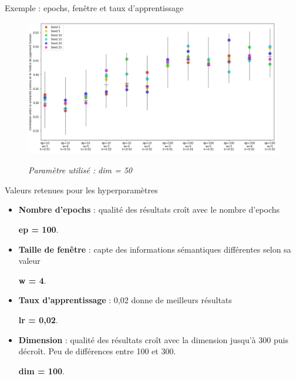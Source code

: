 \documentclass[10pt,xcolor=table,color={dvipsnames,usenames},ignorenonframetext,usepdftitle=false,french]{beamer}
\begin{document}
\begin{frame}{Exemple : epochs, fenêtre et taux d'apprentissage}
\protect\hypertarget{exemple-epochs-fenuxeatre-et-taux-dapprentissage}{}

\begin{figure}[htp]
\begin{center}
\includegraphics[width=1\textwidth]{img/test_parametres.png}
\end{center}
\vspace{-0.3cm}
\footnotesize
\emph{Paramètre utilisé : dim = 50}
\end{figure}

\end{frame}

\begin{frame}{Valeurs retenues pour les hyperparamètres}
\protect\hypertarget{valeurs-retenues-pour-les-hyperparamuxe8tres}{}

\begin{itemize}

\item \textbf{Nombre d'epochs} : qualité des résultats croît avec le nombre d'epochs

\faArrowCircleRight{} \textbf{ep = 100}.

\item \textbf{Taille de fenêtre} : capte des informations sémantiques différentes selon sa valeur

\faArrowCircleRight{} \textbf{w = 4}.

\item \textbf{Taux d'apprentissage} : 0,02 donne de meilleurs résultats

\faArrowCircleRight{} \textbf{lr = 0,02}.

\item \textbf{Dimension} : qualité des résultats croît avec la dimension jusqu'à 300 puis décroît. Peu de différences entre 100 et 300.

\faArrowCircleRight{} \textbf{dim = 100}.

\end{itemize}

\end{frame}
\end{document}
